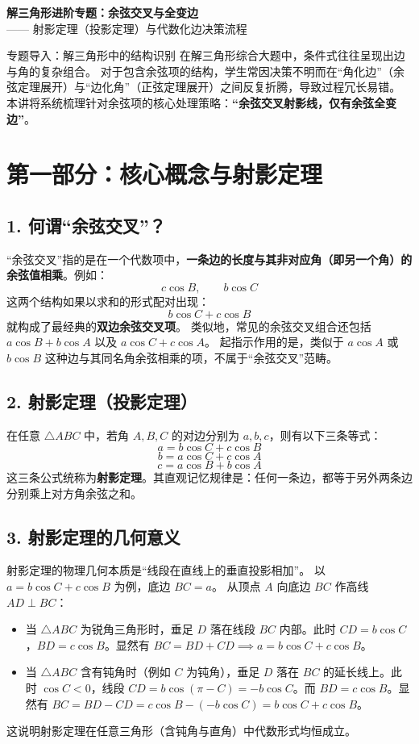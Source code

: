 \documentclass[11pt, a4paper]{ctexart}
\begin{document}
\begin{center}
    {\sffamily \Huge \textbf{解三角形进阶专题：余弦交叉与全变边}} \\
    \vspace{0.3em}
    {\sffamily \Large —— 射影定理（投影定理）与代数化边决策流程}
\end{center}

\vspace{0.2cm}

\begin{conceptbox}{专题导入：解三角形中的结构识别}
在解三角形综合大题中，条件式往往呈现出边与角的复杂组合。
对于包含余弦项的结构，学生常因决策不明而在“角化边”（余弦定理展开）与“边化角”（正弦定理展开）之间反复折腾，导致过程冗长易错。
本讲将系统梳理针对余弦项的核心处理策略：\textbf{“余弦交叉射影线，仅有余弦全变边”}。
\end{conceptbox}

\section{第一部分：核心概念与射影定理}

\subsection{1. 何谓“余弦交叉”？}
“余弦交叉”指的是在一个代数项中，\textbf{一条边的长度与其非对应角（即另一个角）的余弦值相乘}。例如：
\[
c\cos B, \qquad b\cos C
\]
这两个结构如果以求和的形式配对出现：
\[
b\cos C + c\cos B
\]
就构成了最经典的\textbf{双边余弦交叉项}。
类似地，常见的余弦交叉组合还包括 $a\cos B + b\cos A$ 以及 $a\cos C + c\cos A$。
起指示作用的是，类似于 $a\cos A$ 或 $b\cos B$ 这种边与其同名角余弦相乘的项，不属于“余弦交叉”范畴。

\subsection{2. 射影定理（投影定理）}
在任意 $\triangle ABC$ 中，若角 $A, B, C$ 的对边分别为 $a, b, c$，则有以下三条等式：
\[
a = b\cos C + c\cos B
\]
\[
b = a\cos C + c\cos A
\]
\[
c = a\cos B + b\cos A
\]
这三条公式统称为\textbf{射影定理}。其直观记忆规律是：任何一条边，都等于另外两条边分别乘上对方角余弦之和。

\subsection{3. 射影定理的几何意义}
射影定理的物理几何本质是“线段在直线上的垂直投影相加”。
以 $a = b\cos C + c\cos B$ 为例，底边 $BC = a$。
从顶点 $A$ 向底边 $BC$ 作高线 $AD \perp BC$：
\begin{itemize}
  \item 当 $\triangle ABC$ 为锐角三角形时，垂足 $D$ 落在线段 $BC$ 内部。此时 $CD = b\cos C$，$BD = c\cos B$。显然有 $BC = BD + CD \implies a = b\cos C + c\cos B$。
  \item 当 $\triangle ABC$ 含有钝角时（例如 $C$ 为钝角），垂足 $D$ 落在 $BC$ 的延长线上。此时 $\cos C < 0$，线段 $CD = b\cos(\pi - C) = -b\cos C$。而 $BD = c\cos B$。显然有 $BC = BD - CD = c\cos B - (-b\cos C) = b\cos C + c\cos B$。
\end{itemize}
这说明射影定理在任意三角形（含钝角与直角）中代数形式均恒成立。
\end{document}
